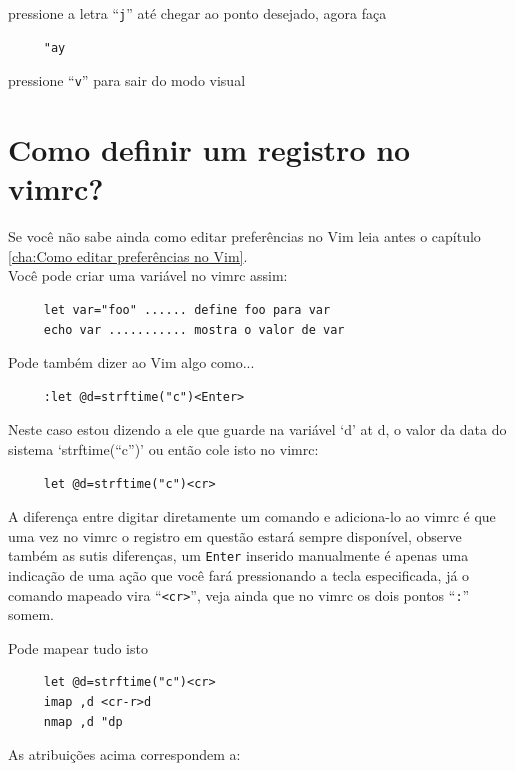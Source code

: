 \documentclass[10pt,a4paper,openany]{book}
\begin{document}
pressione a letra ``\verb|j|'' até chegar ao ponto desejado, agora faça

\begin{verbatim}
     "ay
\end{verbatim}

pressione ``\verb|v|'' para sair do modo visual

\section{Como definir um registro no vimrc?}
\label{Como definir um registro no vimrc?}

Se você não sabe ainda como editar preferências no Vim
leia antes o capítulo \ref{cha:Como editar preferências no Vim}. \\


Você pode criar uma variável no vimrc assim:

\begin{verbatim}
     let var="foo" ...... define foo para var
     echo var ........... mostra o valor de var
\end{verbatim}

Pode também dizer ao Vim algo como...

\begin{verbatim}
     :let @d=strftime("c")<Enter>
\end{verbatim}

Neste caso estou dizendo a ele que guarde na variável `d' at d,
o valor da data do sistema `strftime(``c'')' ou então cole isto no
vimrc:

\begin{verbatim}
     let @d=strftime("c")<cr>
\end{verbatim}

A diferença entre digitar diretamente um comando e adiciona-lo ao
vimrc é que uma vez no vimrc o registro em questão estará sempre
disponível, observe também as sutis diferenças, um {\tt Enter} inserido
manualmente é apenas uma indicação de uma ação que você fará
pressionando a tecla especificada, já o comando mapeado vira
``\verb|<cr>|'', veja ainda que no vimrc os dois pontos ``\verb|:|''
somem.

Pode mapear tudo isto

\begin{verbatim}
     let @d=strftime("c")<cr>
     imap ,d <cr-r>d
     nmap ,d "dp
\end{verbatim}

As atribuições acima correspondem a:
\end{document}
